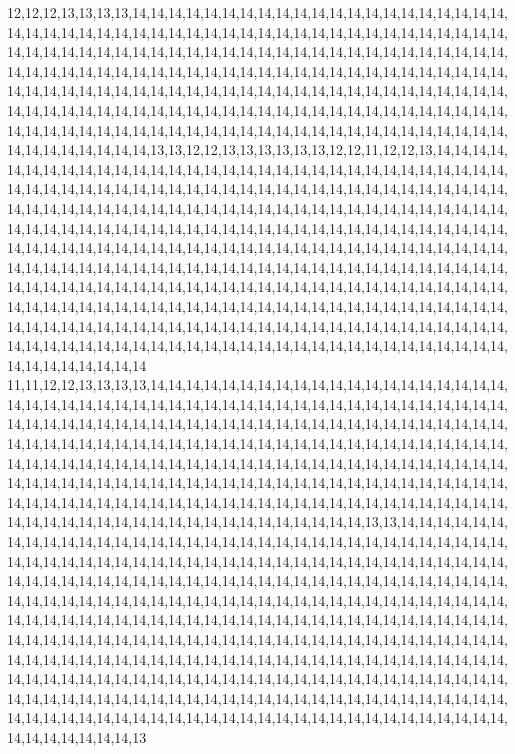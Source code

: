 12,12,12,13,13,13,13,14,14,14,14,14,14,14,14,14,14,14,14,14,14,14,14,14,14,14,14,14,14,14,14,14,14,14,14,14,14,14,14,14,14,14,14,14,14,14,14,14,14,14,14,14,14,14,14,14,14,14,14,14,14,14,14,14,14,14,14,14,14,14,14,14,14,14,14,14,14,14,14,14,14,14,14,14,14,14,14,14,14,14,14,14,14,14,14,14,14,14,14,14,14,14,14,14,14,14,14,14,14,14,14,14,14,14,14,14,14,14,14,14,14,14,14,14,14,14,14,14,14,14,14,14,14,14,14,14,14,14,14,14,14,14,14,14,14,14,14,14,14,14,14,14,14,14,14,14,14,14,14,14,14,14,14,14,14,14,14,14,14,14,14,14,14,14,14,14,14,14,14,14,14,14,14,14,14,14,14,14,14,14,14,14,14,14,14,14,14,14,14,14,14,14,14,14,13,13,12,12,13,13,13,13,13,13,12,12,11,12,12,13,14,14,14,14,14,14,14,14,14,14,14,14,14,14,14,14,14,14,14,14,14,14,14,14,14,14,14,14,14,14,14,14,14,14,14,14,14,14,14,14,14,14,14,14,14,14,14,14,14,14,14,14,14,14,14,14,14,14,14,14,14,14,14,14,14,14,14,14,14,14,14,14,14,14,14,14,14,14,14,14,14,14,14,14,14,14,14,14,14,14,14,14,14,14,14,14,14,14,14,14,14,14,14,14,14,14,14,14,14,14,14,14,14,14,14,14,14,14,14,14,14,14,14,14,14,14,14,14,14,14,14,14,14,14,14,14,14,14,14,14,14,14,14,14,14,14,14,14,14,14,14,14,14,14,14,14,14,14,14,14,14,14,14,14,14,14,14,14,14,14,14,14,14,14,14,14,14,14,14,14,14,14,14,14,14,14,14,14,14,14,14,14,14,14,14,14,14,14,14,14,14,14,14,14,14,14,14,14,14,14,14,14,14,14,14,14,14,14,14,14,14,14,14,14,14,14,14,14,14,14,14,14,14,14,14,14,14,14,14,14,14,14,14,14,14,14,14,14,14,14,14,14,14,14,14,14,14,14,14,14,14,14,14,14,14,14,14,14,14,14,14,14,14,14,14,14,14,14,14,14,14,14,14,14,14,14,14,14,14,14,14,14
11,11,12,12,13,13,13,13,14,14,14,14,14,14,14,14,14,14,14,14,14,14,14,14,14,14,14,14,14,14,14,14,14,14,14,14,14,14,14,14,14,14,14,14,14,14,14,14,14,14,14,14,14,14,14,14,14,14,14,14,14,14,14,14,14,14,14,14,14,14,14,14,14,14,14,14,14,14,14,14,14,14,14,14,14,14,14,14,14,14,14,14,14,14,14,14,14,14,14,14,14,14,14,14,14,14,14,14,14,14,14,14,14,14,14,14,14,14,14,14,14,14,14,14,14,14,14,14,14,14,14,14,14,14,14,14,14,14,14,14,14,14,14,14,14,14,14,14,14,14,14,14,14,14,14,14,14,14,14,14,14,14,14,14,14,14,14,14,14,14,14,14,14,14,14,14,14,14,14,14,14,14,14,14,14,14,14,14,14,14,14,14,14,14,14,14,14,14,14,14,14,14,14,14,14,14,14,14,14,14,14,14,14,14,14,14,13,13,14,14,14,14,14,14,14,14,14,14,14,14,14,14,14,14,14,14,14,14,14,14,14,14,14,14,14,14,14,14,14,14,14,14,14,14,14,14,14,14,14,14,14,14,14,14,14,14,14,14,14,14,14,14,14,14,14,14,14,14,14,14,14,14,14,14,14,14,14,14,14,14,14,14,14,14,14,14,14,14,14,14,14,14,14,14,14,14,14,14,14,14,14,14,14,14,14,14,14,14,14,14,14,14,14,14,14,14,14,14,14,14,14,14,14,14,14,14,14,14,14,14,14,14,14,14,14,14,14,14,14,14,14,14,14,14,14,14,14,14,14,14,14,14,14,14,14,14,14,14,14,14,14,14,14,14,14,14,14,14,14,14,14,14,14,14,14,14,14,14,14,14,14,14,14,14,14,14,14,14,14,14,14,14,14,14,14,14,14,14,14,14,14,14,14,14,14,14,14,14,14,14,14,14,14,14,14,14,14,14,14,14,14,14,14,14,14,14,14,14,14,14,14,14,14,14,14,14,14,14,14,14,14,14,14,14,14,14,14,14,14,14,14,14,14,14,14,14,14,14,14,14,14,14,14,14,14,14,14,14,14,14,14,14,14,14,14,14,14,14,14,14,14,14,14,14,14,14,14,14,14,14,14,14,14,14,14,14,14,14,14,14,14,13
